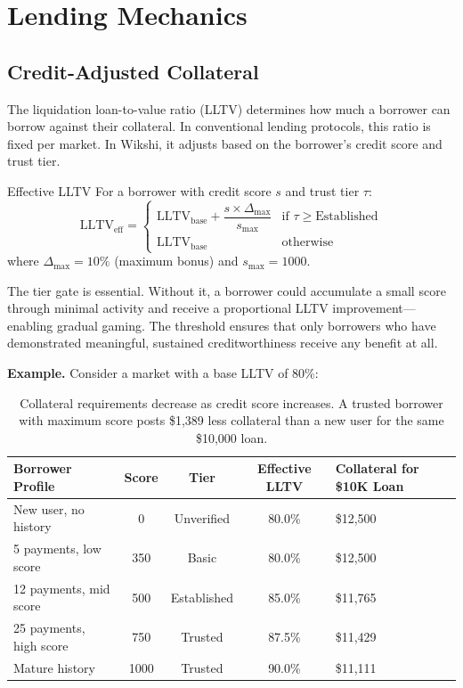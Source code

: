 \documentclass[11pt,a4paper]{article}
\begin{document}
\section{Lending Mechanics}

\subsection{Credit-Adjusted Collateral}

The liquidation loan-to-value ratio (LLTV) determines how much a borrower can borrow against their collateral. In conventional lending protocols, this ratio is fixed per market. In Wikshi, it adjusts based on the borrower's credit score and trust tier.

\begin{definitionbox}{Effective LLTV}
For a borrower with credit score $s$ and trust tier $\tau$:
\[
\text{LLTV}_{\text{eff}} = \begin{cases}
  \text{LLTV}_{\text{base}} + \dfrac{s \times \Delta_{\max}}{s_{\max}} & \text{if } \tau \geq \text{Established} \\[8pt]
  \text{LLTV}_{\text{base}} & \text{otherwise}
\end{cases}
\]
where $\Delta_{\max} = 10\%$ (maximum bonus) and $s_{\max} = 1000$.
\end{definitionbox}

The tier gate is essential. Without it, a borrower could accumulate a small score through minimal activity and receive a proportional LLTV improvement---enabling gradual gaming. The threshold ensures that only borrowers who have demonstrated meaningful, sustained creditworthiness receive any benefit at all.

\textbf{Example.} Consider a market with a base LLTV of 80\%:

\begin{table}[H]
\centering
{}
\begin{tabularx}{\textwidth}{l c c c X}
\toprule
\textbf{Borrower Profile} & \textbf{Score} & \textbf{Tier} & \textbf{Effective LLTV} & \textbf{Collateral for \$10K Loan} \\
\midrule
New user, no history & 0 & Unverified & 80.0\% & \$12{,}500 \\
5 payments, low score & 350 & Basic & 80.0\% & \$12{,}500 \\
12 payments, mid score & 500 & Established & 85.0\% & \$11{,}765 \\
25 payments, high score & 750 & Trusted & 87.5\% & \$11{,}429 \\
Mature history & 1000 & Trusted & 90.0\% & \$11{,}111 \\
\bottomrule
\end{tabularx}
\caption{Collateral requirements decrease as credit score increases. A trusted borrower with maximum score posts \$1{,}389 less collateral than a new user for the same \$10{,}000 loan.}
\label{tab:lltv-examples}
\end{table}
\end{document}
